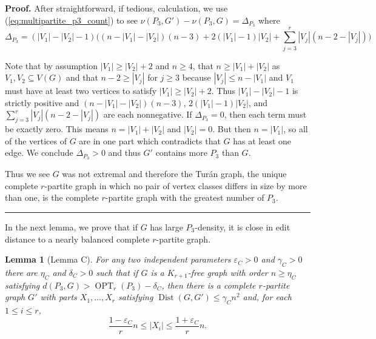 \documentclass[12pt]{article}
\newtheorem{lemma}[thm]{Lemma}
\DeclareMathOperator{\OPT}{OPT}
\DeclareMathOperator{\Dist}{Dist}
\renewenvironment{proof}[1][Proof]{\textbf{#1.} }{\ \rule{0.5em}{0.5em}}
\begin{document}
\begin{proof}
After straightforward, if tedious, calculation, we use
(\ref{eq:multipartite_p3_count}) to see $\nu(P_3,G')- \nu(P_3,G) = \Delta_{P_3}$ where
\[ \Delta_{P_3} = (|V_1|-|V_2|-1)\bigl((n-|V_1|-|V_2|)(n-3) + 2(|V_1|-1)|V_2|+
\sum_{j=3}^r |V_j|(n-2-|V_j|)\bigr) \]

Note that by assumption $|V_1| \ge |V_2|+2$ and $n \ge 4$, that $n \ge |V_1|+|V_2|$
as $V_1, V_2 \subseteq V(G)$ and that $n - 2 \ge |V_j|$ for $j \ge 3$ because $|V_j|
\le n - |V_1|$ and $V_1$ must have at least two vertices to satisfy $|V_1| \ge
|V_2|+2$. Thus $|V_1|-|V_2|-1$ is strictly positive and $(n-|V_1|-|V_2|)(n-3)$,
$2(|V_1|-1)|V_2|$, and $\sum_{j=3}^r |V_j|(n-2-|V_j|)$ are each nonnegative. If
$\Delta_{P_3} = 0$, then each term must be exactly zero. This means $n = |V_1| +
|V_2|$ and $|V_2| = 0$. But then $n = |V_1|$, so all of the vertices of $G$ are
in one part which contradicts that $G$ has at least one edge. We conclude
$\Delta_{P_3} > 0$ and thus $G'$ contains more $P_3$ than $G$.

Thus we see $G$ was not extremal and therefore the Tur\'an graph, the unique
complete $r$-partite graph in which no pair of vertex classes differs in size by
more than one, is the complete $r$-partite graph with the greatest number of $P_3$.
\end{proof}

In the next lemma, we prove that if $G$ has large $P_3$-density, it is close in
edit distance to a nearly balanced complete $r$-partite graph.

\begin{lemma}[Lemma C]\label{lem:partite_sizes_mostly_balanced}
For any two independent parameters $\varepsilon_C > 0$ and $\gamma_C
> 0$ there are $\eta_C$ and $\delta_C > 0$ such that if $G$ is a $K_{r+1}$-free graph with
order $n \ge \eta_C$ satisfying $d(P_3,G) > \OPT_r(P_3)-\delta_C$, then there is
a complete $r$-partite graph $G'$ with parts $X_1, \ldots, X_r$ satisfying
$\Dist(G,G') \le \gamma_C n^2$ and, for each $1 \le i \le r$,
\[ \frac{1-\varepsilon_C}{r}n \le |X_i| \le \frac{1+\varepsilon_C}{r}n. \]
\end{lemma}
\end{document}
